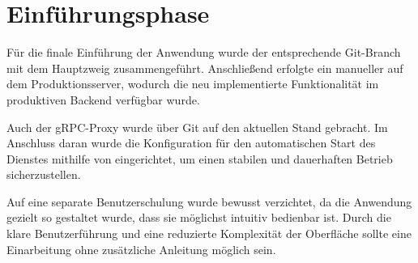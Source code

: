 \section{Einführungsphase}
\label{sec:Einfuehrungsphase}
	Für die finale Einführung der Anwendung wurde der entsprechende Git-Branch mit dem Hauptzweig zusammengeführt.
	Anschließend erfolgte ein manueller  auf dem Produktionsserver,
	wodurch die neu implementierte Funktionalität im produktiven Backend verfügbar wurde.

	Auch der gRPC-Proxy wurde über Git auf den aktuellen Stand gebracht.
	Im Anschluss daran wurde die Konfiguration für den automatischen Start des Dienstes mithilfe von  eingerichtet,
	um einen stabilen und dauerhaften Betrieb sicherzustellen.

	Auf eine separate Benutzerschulung wurde bewusst verzichtet,
	da die Anwendung gezielt so gestaltet wurde, dass sie möglichst intuitiv bedienbar ist.
	Durch die klare Benutzerführung und eine reduzierte Komplexität der Oberfläche
	sollte eine Einarbeitung ohne zusätzliche Anleitung möglich sein.
